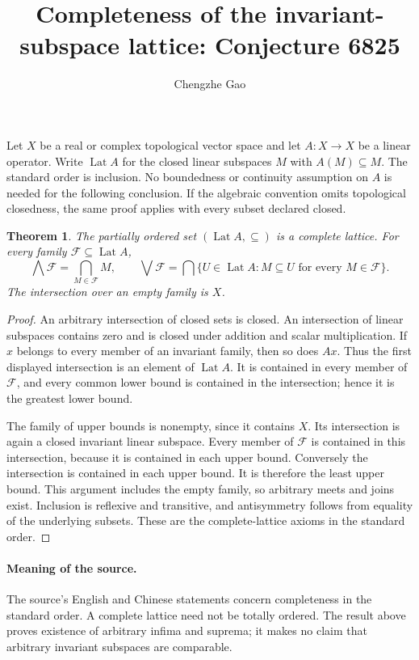 \documentclass[10pt]{article}
\newtheorem{theorem}{Theorem}
\begin{document}
\title{Completeness of the invariant-subspace lattice: Conjecture 6825}
\author{Chengzhe Gao}\date{}\maketitle

Let $X$ be a real or complex topological vector space and let $A:X\to X$
be a linear operator. Write $\operatorname{Lat}A$ for the closed linear
subspaces $M$ with $A(M)\subseteq M$. The standard order is inclusion.
No boundedness or continuity assumption on $A$ is needed for the following
conclusion. If the algebraic convention omits topological closedness,
the same proof applies with every subset declared closed.

\begin{theorem}
The partially ordered set $(\operatorname{Lat}A,\subseteq)$ is a complete
lattice. For every family $\mathcal F\subseteq\operatorname{Lat}A$,
\[
 \bigwedge\mathcal F=\bigcap_{M\in\mathcal F}M,
 \qquad
 \bigvee\mathcal F=
 \bigcap\{U\in\operatorname{Lat}A:
                  M\subseteq U\text{ for every }M\in\mathcal F\}.
\]
The intersection over an empty family is $X$.
\end{theorem}

\begin{proof}
An arbitrary intersection of closed sets is closed. An intersection of
linear subspaces contains zero and is closed under addition and scalar
multiplication. If $x$ belongs to every member of an invariant family,
then so does $Ax$. Thus the first displayed intersection is an element
of $\operatorname{Lat}A$. It is contained in every member of $\mathcal F$,
and every common lower bound is contained in the intersection; hence it
is the greatest lower bound.

The family of upper bounds is nonempty, since it contains $X$. Its
intersection is again a closed invariant linear subspace. Every member
of $\mathcal F$ is contained in this intersection, because it is contained
in each upper bound. Conversely the intersection is contained in each
upper bound. It is therefore the least upper bound. This argument includes
the empty family, so arbitrary meets and joins exist. Inclusion is
reflexive and transitive, and antisymmetry follows from equality of the
underlying subsets. These are the complete-lattice axioms in the standard
order.
\end{proof}

\paragraph{Meaning of the source.}
The source's English and Chinese statements concern completeness in the
standard order. A complete lattice need not be totally ordered. The result
above proves existence of arbitrary infima and suprema; it makes no claim
that arbitrary invariant subspaces are comparable.
\end{document}

